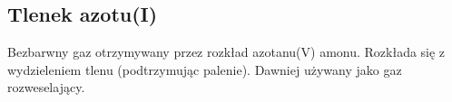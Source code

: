 \subsection{Tlenek azotu(I) }
Bezbarwny gaz otrzymywany przez rozkład azotanu(V) amonu. 
Rozkłada się z wydzieleniem tlenu (podtrzymując palenie).
Dawniej używany jako gaz rozweselający.

